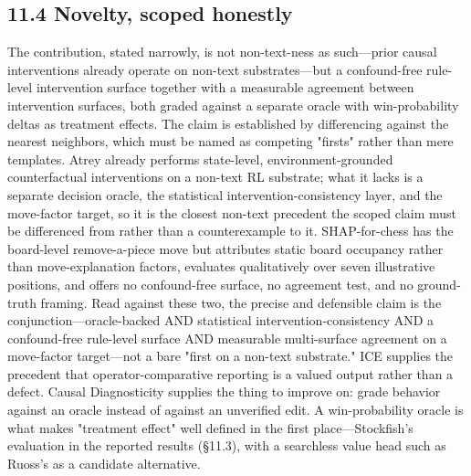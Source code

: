 \documentclass[conference]{IEEEtran}
\begin{document}
\subsection*{11.4 Novelty, scoped honestly}
The contribution, stated narrowly, is not non-text-ness as such---prior causal interventions already operate on non-text substrates---but a confound-free rule-level intervention surface together with a measurable agreement between intervention surfaces, both graded against a separate oracle with win-probability deltas as treatment effects. The claim is established by differencing against the nearest neighbors, which must be named as competing "firsts" rather than mere templates. Atrey \cite{ref32} already performs state-level, environment-grounded counterfactual interventions on a non-text RL substrate; what it lacks is a separate decision oracle, the statistical intervention-consistency layer, and the move-factor target, so it is the closest non-text precedent the scoped claim must be differenced from rather than a counterexample to it. SHAP-for-chess \cite{ref19} has the board-level remove-a-piece move but attributes static board occupancy rather than move-explanation factors, evaluates qualitatively over seven illustrative positions, and offers no confound-free surface, no agreement test, and no ground-truth framing. Read against these two, the precise and defensible claim is the conjunction---oracle-backed AND statistical intervention-consistency AND a confound-free rule-level surface AND measurable multi-surface agreement on a move-factor target---not a bare "first on a non-text substrate." ICE \cite{ref17} supplies the precedent that operator-comparative reporting is a valued output rather than a defect. Causal Diagnosticity \cite{ref15} supplies the thing to improve on: grade behavior against an oracle instead of against an unverified edit. A win-probability oracle is what makes "treatment effect" well defined in the first place---Stockfish's evaluation in the reported results (\S{}11.3), with a searchless value head such as Ruoss's \cite{ref7} as a candidate alternative.
\end{document}
